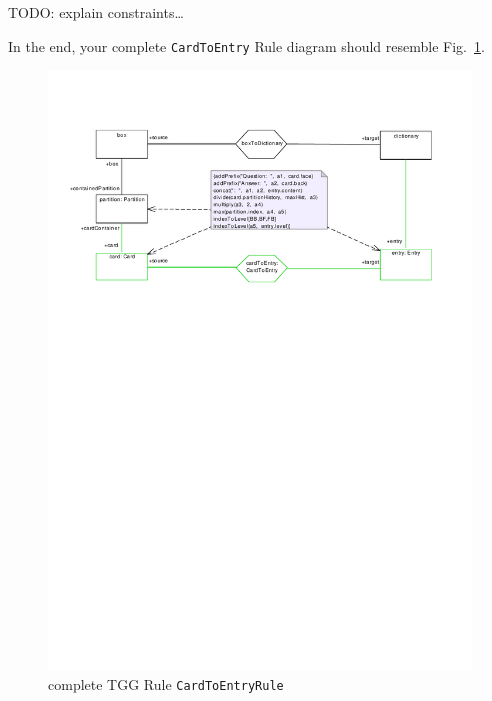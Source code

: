 TODO: explain constraints\ldots

In the end, your complete \texttt{CardToEntry} Rule diagram should resemble Fig.~\ref{fig:cardtoentry_complete}.

\begin{figure}[htbp]
\begin{center}
  \includegraphics[width=\textwidth]{pics/tggBilder/tggRule/tgg20}
  \caption{complete TGG Rule \texttt{CardToEntryRule}}  
  \label{fig:cardtoentry_complete}
\end{center}
\end{figure}
